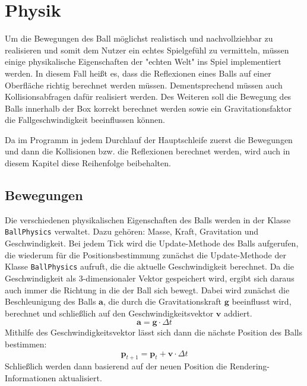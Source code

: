 \chapter{Physik}
\label{Kapitel 4}

Um die Bewegungen des Ball möglichst realistisch und nachvollziehbar zu realisieren und somit dem Nutzer ein echtes Spielgefühl zu vermitteln, müssen einige physikalische Eigenschaften der "{}echten Welt"{} ins Spiel implementiert werden. In diesem Fall heißt es, dass die Reflexionen eines Balls auf einer Oberfläche richtig berechnet werden müssen. Dementsprechend müssen auch Kollisionsabfragen dafür realisiert werden. Des Weiteren soll die Bewegung des Balls innerhalb der Box korrekt berechnet werden sowie ein Gravitationsfaktor die Fallgeschwindigkeit beeinflussen können.

Da im Programm in jedem Durchlauf der Hauptschleife zuerst die Bewegungen und dann die Kollisionen bzw. die Reflexionen berechnet werden, wird auch in diesem Kapitel diese Reihenfolge beibehalten.
\section{Bewegungen}
\label{Kapitel_4_-_Unterkapitel_1}
Die verschiedenen physikalischen Eigenschaften des Balls werden in der Klasse {\texttt{BallPhysics}} verwaltet. Dazu gehören: Masse, Kraft, Gravitation und Geschwindigkeit.
Bei jedem Tick wird die Update-Methode des Balls aufgerufen, die wiederum für die Positionsbestimmung zunächst die Update-Methode der Klasse {\texttt{BallPhysics}} aufruft, die die aktuelle Geschwindigkeit berechnet. Da die Geschwindigkeit als 3-dimensionaler Vektor gespeichert wird, ergibt sich daraus auch immer die Richtung in die der Ball sich bewegt. Dabei wird zunächst die Beschleunigung des Balls $\mathbf{a}$, die durch die Gravitationskraft $\mathbf{g}$ beeinflusst wird, berechnet und schließlich auf den Geschwindigkeitsvektor $\mathbf{v}$ addiert.
 \begin{equation}
	    \label{beschleunigung}
	    \mathbf{a} = \mathbf{g} \cdot \Delta t 
    \end{equation}
Mithilfe des Geschwindigkeitsvektor lässt sich dann die nächste Position des Balls bestimmen:
\begin{equation}
	    \label{position}
	   \mathbf{p}_{t+1} = \mathbf{p}_{t} + \mathbf{v} \cdot \Delta t 
    \end{equation}
Schließlich werden dann basierend auf der neuen Position die Rendering-Informationen aktualisiert. 


